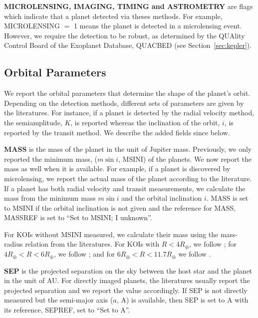 \documentclass[11pt,preprint]{aastex}
\def\rearth{R_\oplus}
\begin{document}
\begin{CJK*}{UTF8}{gbsn}
{\bf MICROLENSING, IMAGING, TIMING and ASTROMETRY} are flags which
indicate that a planet detected via theses methods. For example,
MICROLENSING $=$ 1 means the planet is detected in a microlensing
event. However, we require the detection to be robust, as determined
by the QUAlity Control Board of the Exoplanet Database, QUACBED (see
Section~\ref{sec:kepler}). 


\subsection{Orbital Parameters}\label{sec:orbit}

We report the orbital parameters that determine the shape of the
planet's orbit. Depending on the detection methods, different sets of
parameters are given by the literatures. For instance, if a planet is
detected by the radial velocity method, the semiamplitude, $K$, is
reported whereas the inclination of the orbit, $i$, is reported by the
transit method. We describe the added fields since \cite{Wright2011}
below.  

{\bf MASS} is the mass of the planet in the unit of Jupiter
mass. Previously, we only reported the minimum mass, ($m\sin{i}$,
MSINI) of the planets. We now report the mass as well when it is
available. For example, if a planet is discovered by microlensing, we
report the actual mass of the planet according to the literature. If a
planet has both radial velocity and transit measurements, we calculate
the mass from the minimum mass $m\sin{i}$ and the orbital inclination
$i$. MASS is set to MSINI if the orbital inclination is not given and
the reference for MASS, MASSREF is set to ``Set to MSINI; I unknown''.

For KOIs without MSINI measured, we calculate their mass using the
mass-radius relation from the literatures. For KOIs with $R<4\rearth$,
we follow \cite{Weiss2014}; for $4\rearth<R<6\rearth$, we follow
\cite{Lissauer2011}; and for $6\rearth<R<11.7\rearth$ we follow
\cite{Mordasini2012}.  

{\bf SEP} is the projected separation on the sky between the host star
and the planet in the unit of AU. For directly imaged planets, the
literatures usually report the projected separation and we report the
value accordingly.  If SEP is not directly measured but the semi-major
axis ($a$, A) is available, then SEP is set to A with its reference,
SEPREF, set to ``Set to A''. 


\end{CJK*}
\end{document}
